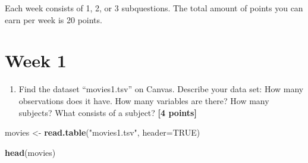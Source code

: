 \documentclass[
]{article}
\newenvironment{Shaded}{\begin{snugshade}}{\end{snugshade}}
\newcommand{\AttributeTok}[1]{\textcolor[rgb]{0.13,0.29,0.53}{#1}}
\newcommand{\ConstantTok}[1]{\textcolor[rgb]{0.56,0.35,0.01}{#1}}
\newcommand{\FunctionTok}[1]{\textcolor[rgb]{0.13,0.29,0.53}{\textbf{#1}}}
\newcommand{\NormalTok}[1]{#1}
\newcommand{\OtherTok}[1]{\textcolor[rgb]{0.56,0.35,0.01}{#1}}
\newcommand{\StringTok}[1]{\textcolor[rgb]{0.31,0.60,0.02}{#1}}
\providecommand{\tightlist}{%
  \setlength{\itemsep}{0pt}\setlength{\parskip}{0pt}}
\begin{document}
Each week consists of 1, 2, or 3 subquestions. The total amount of
points you can earn per week is 20 points.

\section{Week 1}\label{week-1}

\begin{enumerate}
\def\labelenumi{\arabic{enumi}.}
\tightlist
\item
  Find the dataset ``movies1.tsv'' on Canvas. Describe your data set:
  How many observations does it have. How many variables are there? How
  many subjects? What consists of a subject? \textbf{[4 points]}
\end{enumerate}

\begin{Shaded}
\begin{Highlighting}[]
\NormalTok{movies }\OtherTok{\textless{}{-}} \FunctionTok{read.table}\NormalTok{(}\StringTok{"movies1.tsv"}\NormalTok{, }\AttributeTok{header=}\ConstantTok{TRUE}\NormalTok{)}

\FunctionTok{head}\NormalTok{(movies)}
\end{Highlighting}
\end{Shaded}
\end{document}

